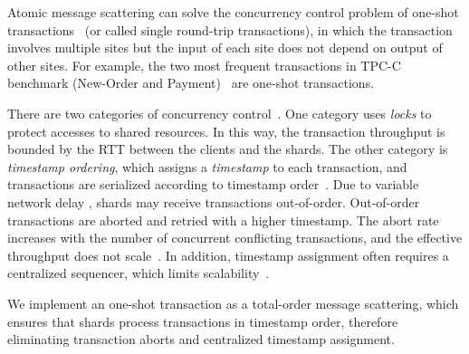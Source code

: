 Atomic message scattering can solve the concurrency control problem of one-shot transactions~\cite{kallman2008h} (or called single round-trip transactions), in which the transaction involves multiple sites but the input of each site does not depend on output of other sites.
For example, the two most frequent transactions in TPC-C benchmark (New-Order and Payment)~\cite{tpcc} are one-shot transactions.

 There are two categories of concurrency control~\cite{bernstein1981concurrency}.
One category uses \textit{locks} to protect accesses to shared resources.
In this way, the transaction throughput is bounded by the RTT between the clients and the shards.
The other category is \textit{timestamp ordering}, which assigns a \textit{timestamp} to each transaction, and transactions are serialized according to timestamp order~\cite{kung1981optimistic,bernstein1983multiversion}.
Due to variable network delay , shards may receive transactions out-of-order.
Out-of-order transactions are aborted and retried with a higher timestamp.
The abort rate increases with the number of concurrent conflicting transactions, and the effective throughput does not scale~\cite{yu2014staring}.
In addition, timestamp assignment often requires a centralized sequencer, which limits scalability~\cite{yu2014staring}.

We implement an one-shot transaction as a total-order message scattering, which ensures that shards process transactions in timestamp order, therefore eliminating transaction aborts and centralized timestamp assignment.
\fi



